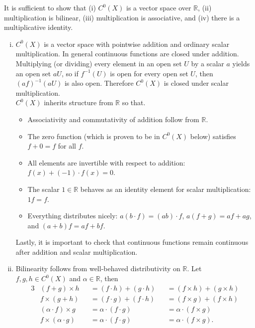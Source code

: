 \documentclass{article}
\newenvironment{problem}[2][Problem]{\begin{trivlist}
\item[\hskip \labelsep {\bfseries #1}\hskip \labelsep {\bfseries #2.}]}{\end{trivlist}}
\newenvironment{problempart}[1]{\begin{trivlist}\item[\textbf{Part #1.}]}{\end{trivlist}}
\begin{document}
\begin{problem}{7}
\begin{problempart}{(b)}
    It is sufficient to show that
    (i) $C^0(X)$ is a vector space over $\mathbb{R}$,
    (ii) multiplication is bilinear,
    (iii) multiplication is associative, and
    (iv) there is a multiplicative identity.
    \begin{enumerate}[(i)]
      \item $C^0(X)$ is a vector space with pointwise addition and ordinary scalar
        multiplication. In general continuous functions are closed under addition.
        Multiplying (or dividing) every element in an open set $U$ by a scalar $a$
        yields an open set $aU$,
        so if $f^{-1}(U)$ is open for every open set $U$,
        then $(af)^{-1}(aU)$ is also open.
        Therefore $C^0(X)$ is closed under scalar multiplication.\\
        $C^0(X)$ inherits structure from $\mathbb{R}$ so that.
        \begin{itemize}
          \item Associativity and commutativity of addition follow from $\mathbb{R}$.
          \item The zero function (which is proven to be in $C^0(X)$ below) satisfies $f + 0 = f$ for all $f$.
          \item All elements are invertible with respect to addition: $f(x) + (-1)\cdot f(x) = 0$.
          \item The scalar $1 \in \mathbb{R}$ behaves as an identity element for scalar multiplication: $1f = f$.
          \item Everything distributes nicely: $a(b \cdot f) = (ab) \cdot f$, $a(f + g) = af + ag$, and $(a + b)f = af + bf$.
        \end{itemize}
        Lastly, it is important to check that continuous functions remain
        continuous after addition and scalar multiplication.
      \item Bilinearity follows from well-behaved distributivity on $\mathbb{R}.$
        Let $f,g,h\in C^0(X)$ and $\alpha \in \mathbb{R}$, then
      \begin{alignat*}{3}
        &(f + g) \times h &&= (f \cdot h) + (g \cdot h) &&= (f \times h) + (g \times h)\\
        &f \times (g + h) &&= (f \cdot g) + (f \cdot h) &&= (f \times g) + (f \times h)\\
        &(\alpha \cdot f) \times g &&= \alpha \cdot (f \cdot g) &&= \alpha \cdot (f \times g) \\
        &f \times (\alpha \cdot g) &&= \alpha \cdot (f \cdot g) &&= \alpha \cdot (f \times g).

\end{alignat*}
\end{enumerate}
\end{problempart}
\end{problem}
\end{document}
